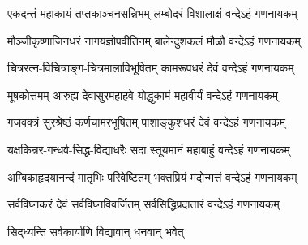 
\twolineshloka
{एकदन्तं महाकायं तप्तकाञ्चनसन्निभम्}
{लम्बोदरं विशालाक्षं वन्देऽहं गणनायकम्}

\twolineshloka
{मौञ्जीकृष्णाजिनधरं नागयज्ञोपवीतिनम्}
{बालेन्दुशकलं मौळौ वन्देऽहं गणनायकम्}

\twolineshloka
{चित्ररत्न-विचित्राङ्ग-चित्रमालाविभूषितम्}
{कामरूपधरं देवं वन्देऽहं गणनायकम्}

\twolineshloka
{मूषकोत्तमम् आरुह्य देवासुरमहाहवे}
{योद्धुकामं महावीर्यं वन्देऽहं गणनायकम्}

\twolineshloka
{गजवक्त्रं सुरश्रेष्ठं कर्णचामरभूषितम्}
{पाशाङ्कुशधरं देवं वन्देऽहं गणनायकम्}

\twolineshloka
{यक्षकिन्नर-गन्धर्व-सिद्ध-विद्याधरैः सदा}
{स्तूयमानं महाबाहुं वन्देऽहं गणनायकम्}

\twolineshloka
{अम्बिकाहृदयानन्दं मातृभिः परिवेष्टितम्}
{भक्तप्रियं मदोन्मत्तं वन्देऽहं गणनायकम्}

\twolineshloka
{सर्वविघ्नकरं देवं सर्वविघ्नविवर्जितम्}
{सर्वसिद्धिप्रदातारं वन्देऽहं गणनायकम्}

{सिद्‌ध्यन्ति सर्वकार्याणि विद्यावान् धनवान् भवेत्}
